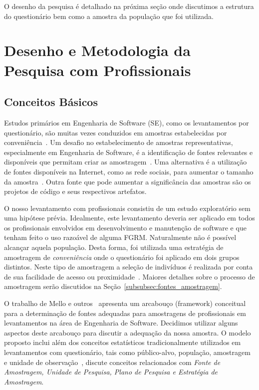O desenho da pesquisa é detalhado na próxima seção onde discutimos a estrutura
do questionário bem como a amostra da população que foi utilizada.

\section{Desenho e Metodologia da Pesquisa com Profissionais}
\label{sec:desenho_da_pesquisa_com_profissionais}

\subsection{Conceitos Básicos}

Estudos primários em Engenharia de Software (SE), como os levantamentos por
questionário, são muitas vezes conduzidos em amostras estabelecidas por
conveniência~\cite{sjoberg2005survey, dybaa2006systematic}. Um desafio no
estabelecimento de amostras representativas, especialmente em Engenharia de
Software, é a identificação de fontes relevantes e disponíveis que permitam
criar as amostragem~\cite{de2014towards}. Uma alternativa é a utilização de
fontes disponíveis na Internet, como as rede sociais, para aumentar o tamanho da
amostra~\cite{de2013would}. Outra fonte que pode aumentar a significância das
amostras são os projetos de código e seus respectivos artefatos.

O nosso levantamento com profissionais consistiu de um estudo exploratório sem
uma hipótese prévia. Idealmente, este levantamento deveria ser aplicado em todos
os profissionais envolvidos em desenvolvimento e manutenção de software e que
tenham feito o uso razoável de alguma FGRM\@. Naturalmente não é possível alcançar
aquela população. Desta forma, foi utilizada uma estratégia de amostragem de
\textit{conveniência} onde o questionário foi aplicado em dois grupos distintos.
Neste tipo de amostragem a seleção de indivíduos é realizada por conta de sua
facilidade de acesso ou proximidade~\cite{marshall1996sampling}. Maiores
detalhes sobre o processo de amostragem serão discutidos na
Seção~\ref{subsubsec:fontes_amostragem}.

O trabalho de Mello e outros~\cite{de2014towards} apresenta um
arcabouço (framework) conceitual para a determinação de fontes adequadas para
amostragens de profissionais em levantamentos na área de Engenharia de Software.
Decidimos utilizar alguns aspectos deste arcabouço para discutir a adequação da
nossa amostra. O modelo proposto inclui além dos conceitos estatísticos
tradicionalmente utilizados em levantamentos com questionário, tais como
público-alvo, população, amostragem e unidade de
observação~\cite{thompson2012sampling}, discute conceitos relacionados com
\textit{Fonte de Amostragem, Unidade de Pesquisa, Plano de Pesquisa e Estratégia
	de Amostragem}.

